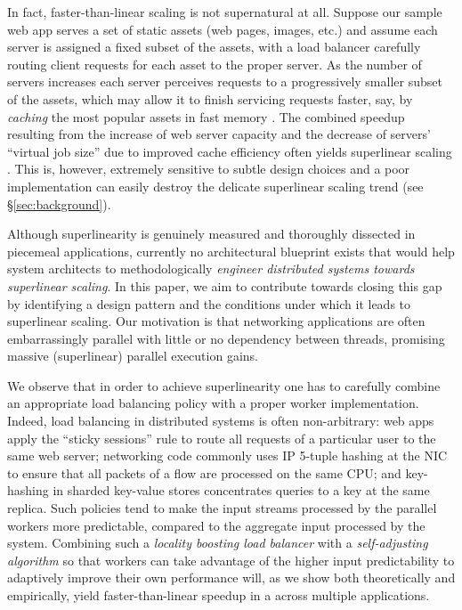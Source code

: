In fact, faster-than-linear scaling is not supernatural at all. Suppose our sample web app serves a set of static assets (web pages, images, etc.) and assume each server is assigned a fixed subset of the assets, with a load balancer carefully routing client requests for each asset to the proper server. As the number of servers increases each server perceives requests to a progressively smaller subset of the assets, which may allow it to finish servicing requests faster, say, by \emph{caching} the most popular assets in fast memory \cite{10.5555/1012889.1012894, 271208}. The combined speedup resulting from the increase of web server capacity and the decrease of servers' ``virtual job size'' due to improved cache efficiency often yields superlinear scaling \cite{556383, dobb-1, dobb-2, 7733347, 80148, wikipedia, 10.1145/42411.42415, 556383, scalability-analyzed, icsoft20}. This is, however, extremely sensitive to subtle design choices and a poor implementation can easily destroy the delicate superlinear scaling trend (see \S\ref{sec:background}).

Although superlinearity is genuinely measured \cite{scalability-analyzed, sdn-analytitcs, 6483679, 10.1007/978-3-319-77610-1, 10.1145/3627703.3629574, icsoft20} and thoroughly dissected \cite{dobb-1, dobb-2, 10.1145/2773212.2789974, 556383, 7733347, 80148} in piecemeal applications, currently no architectural blueprint exists that would help system architects to methodologically \emph{engineer distributed systems towards superlinear scaling}. In this paper, we aim to contribute towards closing this gap by identifying a design pattern and the conditions under which it leads to superlinear scaling.
Our motivation is that networking applications are often embarrassingly parallel with little or no dependency between threads, promising massive (superlinear) parallel execution gains.

We observe that in order to achieve superlinearity one has to carefully combine an appropriate load balancing policy with a proper worker implementation. Indeed, load balancing in distributed systems is often non-arbitrary: web apps apply the ``sticky sessions'' rule to route all requests of a particular user to the same web server; %
networking code commonly uses IP 5-tuple hashing at the NIC to ensure that all packets of a flow are processed on the same CPU; %
and key-hashing in sharded key-value stores concentrates queries to a key at the same replica. Such policies tend to make the input streams processed by the parallel workers more predictable, compared to the aggregate input processed by the system. Combining such a \emph{locality boosting load balancer} with a \emph{self-adjusting algorithm} so that workers can take advantage of the higher input predictability to adaptively improve their own performance will, as we show both theoretically and empirically, yield faster-than-linear speedup in a across multiple applications.

